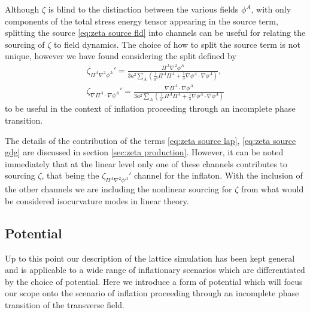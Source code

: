 Although $\zeta$ is blind to the distinction between the various fields $\phi^A$, with only components of the total stress energy tensor appearing in the source term, splitting the source \eqref{eq:zeta source fld} into channels can be useful for relating the sourcing of $\zeta$ to field dynamics. The choice of how to split the source term is not unique, however we have found considering the split defined by
\begin{align}
  \zeta_{\Pi^A\nabla^2\phi^A}' = \frac{\Pi^A\nabla^2\phi^A}{3a^2\sum_A\left(\frac{1}{a^4}\Pi^A\Pi^A + \frac{1}{3}\nabla\phi^A\cdot\nabla\phi^A \right)}, \label{eq:zeta source lap}\\
  \zeta_{\nabla\Pi^A\cdot\nabla\phi^A}' = \frac{\nabla\Pi^A\cdot\nabla\phi^A}{3a^2\sum_A\left(\frac{1}{a^4}\Pi^A\Pi^A + \frac{1}{3}\nabla\phi^A\cdot\nabla\phi^A \right)} \label{eq:zeta source gdg}
\end{align}
to be useful in the context of inflation proceeding through an incomplete phase transition.

The details of the contribution of the terms \eqref{eq:zeta source lap}, \eqref{eq:zeta source gdg} are discussed in section \ref{sec:zeta production}. However, it can be noted immediately that at the linear level only one of these channels contributes to sourcing $\zeta$, that being the $\zeta_{\Pi^A\nabla^2\phi^A}'$ channel for the inflaton. With the inclusion of the  other channels we are including the nonlinear sourcing for $\zeta$ from what would be considered isocurvature modes in linear theory.



\subsection{Potential} \label{sec:potential}
Up to this point our description of the lattice simulation has been kept general and is applicable to a wide range of inflationary scenarios which are differentiated by the choice of potential. Here we introduce a form of potential which will focus our scope onto the scenario of inflation proceeding through an incomplete phase transition of the transverse field. 

